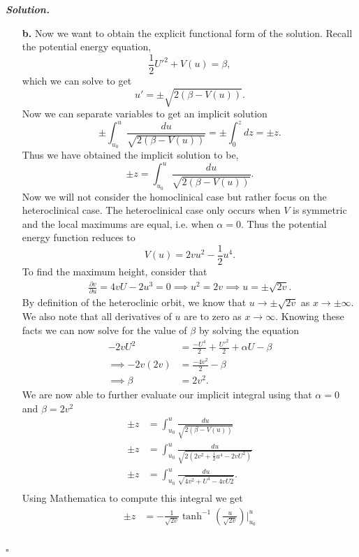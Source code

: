 \documentclass[12pt]{report}
\newenvironment{solution}[1][\it{Solution}]{\textbf{#1. } }{$\square$}
\newcommand{\paren}[1]{{\left(#1\right)}} %
\newcommand{\pp}[2]{\frac{\partial #1}{\partial #2}} %
\begin{document}
\begin{solution}
\begin{enumerate}
        \item[{\bf b.}]
        Now we want to obtain the explicit functional form of the solution. Recall the potential energy equation,
        \[ 
            \frac{1}{2}U'^2 + V(u) = \beta,
        \]
        which we can solve to get
        \[
            u' = \pm \sqrt{2(\beta - V(u))}.
        \]
        Now we can separate variables to get an implicit solution 
        \[
            \pm\int_{u_0}^u \frac{du}{\sqrt{2(\beta - V(u))}} = \pm \int_0^zdz = \pm z.
        \]
        Thus we have obtained the implicit solution to be,
        \[
            \pm z = \int_{u_0}^u \frac{du}{\sqrt{2(\beta - V(u))}}.
        \]
        Now we will not consider the homoclinical case but rather focus on the heteroclinical case. The heteroclinical case only occurs when $V$ is symmetric and the local maximums are equal, i.e. when $\alpha = 0$. Thus the potential energy function reduces to
        \[
        V(u) = 2vu^2 - \frac{1}{2}u^4. 
        \]
        To find the maximum height, consider that
        \begin{align*}
            \pp{v}{u} = 4vU - 2u^3 = 0 \implies u^2 = 2v \implies u = \pm \sqrt{2v}.
        \end{align*}
        By definition of the heteroclinic orbit, we know that $u \to \pm \sqrt{2v}$ as $x \to \pm \infty$. We also note that all derivatives of $u$ are to zero as $x \to \infty$. Knowing these facts we can now solve for the value of $\beta$ by solving the equation
        \begin{align*}
            -2vU^2 &= \frac{-U^4}{2} + \frac{U'^2}{2} + \alpha U - \beta\\
            \implies -2v(2v) &= \frac{-4v^2}{2} - \beta\\
            \implies \beta &= 2v^2.
        \end{align*}
        We are now able to further evaluate our implicit integral using that $\alpha = 0$ and $\beta = 2v^2$
        \begin{align*}
            \pm z &= \int_{u_0}^u \frac{du}{\sqrt{2(\beta - V(u))}}\\
            \pm z &= \int_{u_0}^u \frac{du}{\sqrt{2(2v^2 + \frac{1}{2}u^4 - 2vU^2)}}\\
            \pm z &= \int_{u_0}^u \frac{du}{\sqrt{4v^2 + U^4 - 4vU2}}.\\
        \end{align*}
        Using Mathematica to compute this integral we get
        \begin{align*}
            \pm z &= - \frac{1}{\sqrt{2v}}\tanh^{-1}\paren{\frac{u}{\sqrt{2v}}} |_{u_0}^u\\

\end{align*}
\end{enumerate}
\end{solution}
\end{document}

